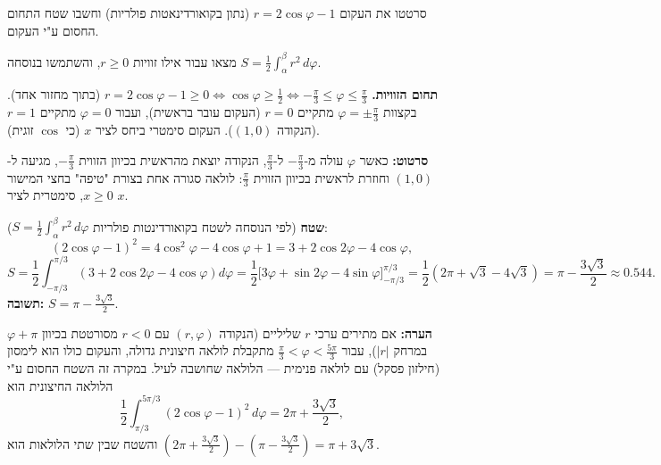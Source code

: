 
\begin{question}
סרטטו את העקום $r=2\cos\varphi-1$ (נתון בקואורדינאטות פולריות) וחשבו שטח התחום החסום ע"י העקום.
\end{question}

\begin{hint}
מצאו עבור אילו זוויות $r\ge0$, והשתמשו בנוסחה $S=\frac12\int_\alpha^\beta r^2\,d\varphi$.
\end{hint}

\begin{solution}
\textbf{תחום הזוויות.} $r=2\cos\varphi-1\ge0\iff\cos\varphi\ge\frac12\iff -\frac\pi3\le\varphi\le\frac\pi3$ (בתוך מחזור אחד). בקצוות $\varphi=\pm\frac\pi3$ מתקיים $r=0$ (העקום עובר בראשית), ועבור $\varphi=0$ מתקיים $r=1$ (הנקודה $(1,0)$). העקום סימטרי ביחס לציר $x$ (כי $\cos$ זוגית).

\textbf{סרטוט:} כאשר $\varphi$ עולה מ-$-\frac\pi3$ ל-$\frac\pi3$, הנקודה יוצאת מהראשית בכיוון הזווית $-\frac\pi3$, מגיעה ל-$(1,0)$ וחוזרת לראשית בכיוון הזווית $\frac\pi3$: לולאה סגורה אחת בצורת "טיפה" בחצי המישור $x\ge0$, סימטרית לציר $x$.

\textbf{שטח} (לפי הנוסחה לשטח בקואורדינטות פולריות $S=\frac12\int_\alpha^\beta r^2\,d\varphi$):
\[
(2\cos\varphi-1)^2=4\cos^2\varphi-4\cos\varphi+1=3+2\cos2\varphi-4\cos\varphi,
\]
\[
S=\frac12\int_{-\pi/3}^{\pi/3}\left(3+2\cos2\varphi-4\cos\varphi\right)d\varphi
=\frac12\Big[3\varphi+\sin2\varphi-4\sin\varphi\Big]_{-\pi/3}^{\pi/3}
=\frac12\left(2\pi+\sqrt3-4\sqrt3\right)=\pi-\frac{3\sqrt3}{2}\approx0.544.
\]
\textbf{תשובה:} $S=\pi-\frac{3\sqrt3}{2}$.

\textbf{הערה:} אם מתירים ערכי $r$ שליליים (הנקודה $(r,\varphi)$ עם $r<0$ מסורטטת בכיוון $\varphi+\pi$ במרחק $|r|$), עבור $\frac\pi3<\varphi<\frac{5\pi}3$ מתקבלת לולאה חיצונית גדולה, והעקום כולו הוא לימסון (חילזון פסקל) עם לולאה פנימית — הלולאה שחושבה לעיל. במקרה זה השטח החסום ע"י הלולאה החיצונית הוא
\[
\frac12\int_{\pi/3}^{5\pi/3}(2\cos\varphi-1)^2\,d\varphi=2\pi+\frac{3\sqrt3}{2},
\]
והשטח שבין שתי הלולאות הוא $\left(2\pi+\frac{3\sqrt3}{2}\right)-\left(\pi-\frac{3\sqrt3}{2}\right)=\pi+3\sqrt3$.
\end{solution}
